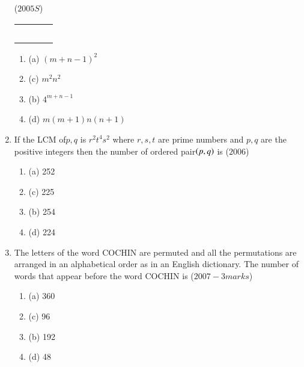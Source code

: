 \documentclass[journal,12pt,twocolumn]{IEEEtran}
\theoremstyle{remark}
\begin{document}
\begin{enumerate}[start=3]
\hfill{($2005S$)}\\
\begin{center}
\begin{tabular}{|c|c|c|c|}
\hline
\quad&\quad&\quad&\quad\\
\hline
\quad&\quad&\quad&\quad\\
\hline
\quad&\quad&\quad&\quad\\
\hline\quad&\quad&\quad&\quad\\
\hline\quad&\quad&\quad&\quad\\
\hline\quad&\quad&\quad&\quad\\
\hline
\end{tabular}
\end{center}
\begin{multicols}{2} 
\begin{enumerate}
[label=, left=0pt, labelsep=0pt, itemsep=1em]
\item (a) $(m+n-1)^2$
\item (c) $m^2n^2$\item (b) $4^{m+n-1}$\item(d) $m(m+1)n(n+1)$
\end{enumerate}
\end{multicols}
\item If the LCM of$p,q$ is $r^2t^4s^2$ where $r,s,t$ are prime numbers and $p,q$ are the positive integers then the number of ordered pair$\left(p,q\right)$ is \hfill{($2006$)}\\
\begin{multicols}{2} 
\begin{enumerate}
[label=, left=0pt, labelsep=0pt, itemsep=1em]
\item (a) 252\item  (c) 225
\item (b) 254\item (d) 224
\end{enumerate}
\end{multicols}
\item The letters of the word COCHIN are permuted and all the permutations are arranged in an alphabetical order as in an English dictionary. The number of words that appear before the word COCHIN is
\hfill{($2007-3 marks$)}\\
\begin{multicols}{2} 
\begin{enumerate}
[label=, left=0pt, labelsep=0pt, itemsep=1em]
\item (a) 360\item (c) 96\item(b) 192\item (d) 48

\end{enumerate}
\end{multicols}
\end{enumerate}
\end{document}
